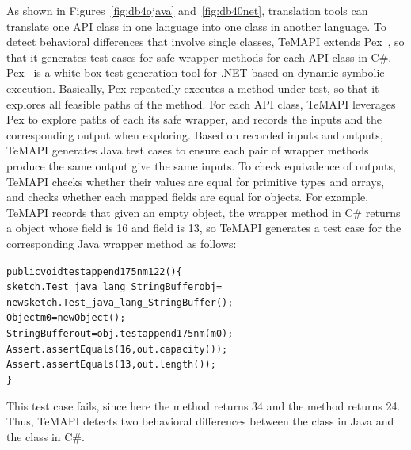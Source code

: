 As shown in Figures~\ref{fig:db4ojava} and~\ref{fig:db40net}, translation tools can translate one API class in one language into one class in another language. To detect behavioral differences that involve single classes, TeMAPI extends Pex~\cite{tillmann2008pex}, so that it generates test cases for safe wrapper methods for each API class in C\#. Pex~\cite{tillmann2008pex} is a white-box test generation tool for .NET based on dynamic symbolic execution. Basically, Pex repeatedly executes a method under test, so that it explores all feasible paths of the method.
For each API class, TeMAPI leverages Pex to explore paths of each its safe wrapper, and records the inputs and the corresponding output when exploring. Based on recorded inputs and outputs, TeMAPI generates Java test cases to ensure each pair of wrapper methods produce the same output give the same inputs. To check equivalence of  outputs, TeMAPI checks whether their values are equal for primitive types and arrays, and checks whether each mapped fields are equal for objects. For example, TeMAPI records that given an empty object, the  wrapper method in C\# returns a  object whose  field is 16 and  field is 13, so TeMAPI generates a test case for the corresponding Java wrapper method as follows:

\begin{CodeOut}\vspace*{-1ex}
\begin{alltt}
public void testappend175nm122()\{
  sketch.Test_java_lang_StringBuffer obj =
      new sketch.Test_java_lang_StringBuffer();
  Object m0 = new Object();
  StringBuffer out = obj.testappend175nm(m0);
  Assert.assertEquals(16, out.capacity());	
  Assert.assertEquals(13, out.length());
\}
\end{alltt}
\end{CodeOut}\vspace*{-2ex}

This test case fails, since here the  method returns 34 and the  method returns 24. Thus, TeMAPI detects two behavioral differences between the  class in Java and the  class in C\#.


